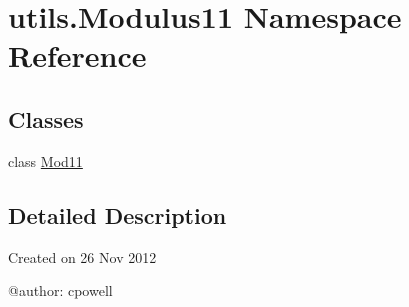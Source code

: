 \hypertarget{namespaceutils_1_1_modulus11}{\section{utils.\-Modulus11 Namespace Reference}
\label{namespaceutils_1_1_modulus11}
}
\subsection*{Classes}
\begin{DoxyCompactItemize}
\item 
class \hyperlink{classutils_1_1_modulus11_1_1_mod11}{Mod11}
\end{DoxyCompactItemize}


\subsection{Detailed Description}
\begin{DoxyVerb}Created on 26 Nov 2012

@author: cpowell
\end{DoxyVerb}
 